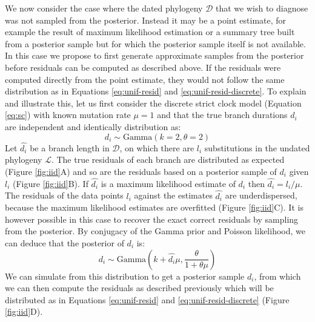 \documentclass{article}
\begin{document}
We now consider the case where the dated phylogeny $\mathcal{D}$ that we wish
to diagnose was not sampled from the posterior. Instead it may be a point estimate, 
for example the result of maximum likelihood estimation
or a summary tree built from a posterior sample \citep{heledLookingTreesForest2013}
but for which the posterior sample itself is not available.
In this case we propose to first generate approximate 
samples from the posterior before residuals can be computed as described above.
If the residuals were computed directly from the point estimate, they would not follow the same distribution as in Equations
\ref{eq:unif-resid} and \ref{eq:unif-resid-discrete}.
To explain and illustrate this, let us first consider the discrete strict clock model (Equation \ref{eq:sc})
with known mutation rate $\mu=1$
and that the true branch durations $d_i$ are independent and identically
distribution as:
\begin{equation}
d_i \sim \mathrm{Gamma}(k=2,\theta=2)
\end{equation}
Let $\hat{d_i}$ be a branch length in $\mathcal{D}$, on which there are $l_i$ substitutions in the undated phylogeny $\mathcal{L}$. 
The true residuals of each branch are distributed as expected (Figure \ref{fig:iid}A)
and so are the residuals based on a posterior sample of $d_i$ given $l_i$ (Figure \ref{fig:iid}B).
If $\hat{d_i}$ is a maximum likelihood estimate of $d_i$ then
$\hat{d_i}=l_i/\mu$.
The residuals of the data points $l_i$ against the estimates $\hat{d_i}$ are
underdispersed, because the maximum likelihood estimates are overfitted (Figure \ref{fig:iid}C).
It is however possible in this case to recover the exact correct residuals by sampling from
the posterior. 
By conjugacy of the Gamma prior and Poisson likelihood, we can deduce that the posterior of $d_i$ is:
\begin{equation}
d_i \sim \mathrm{Gamma}\left(k+\hat{d_i} \mu,\frac{\theta}{1+\theta \mu}\right)
\end{equation}
We can simulate from this distribution to get a posterior sample $d_i$, from which we can then compute the residuals as 
described previously which will be distributed as in 
Equations \ref{eq:unif-resid} and \ref{eq:unif-resid-discrete} (Figure \ref{fig:iid}D).
\end{document}
